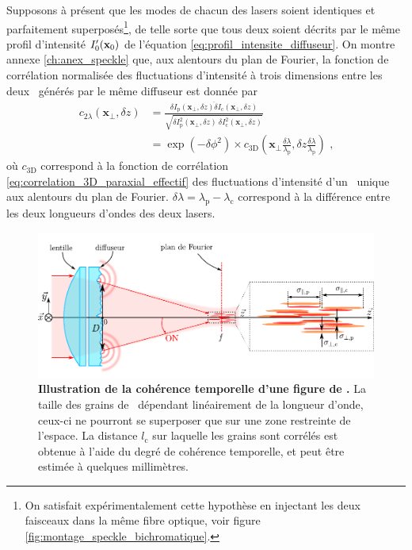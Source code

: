 Supposons à présent que les modes de chacun des lasers soient identiques et parfaitement superposés\footnote{On satisfait expérimentalement cette hypothèse en injectant les deux faisceaux dans la même fibre optique, voir figure \ref{fig:montage_speckle_bichromatique}.}, de telle sorte que tous deux soient décrits par le même profil d'intensité $I'_0(\mathbf{x}_0)$ de l'équation \ref{eq:profil_intensite_diffuseur}. On montre annexe \ref{ch:anex_speckle} que, aux alentours du plan de Fourier, la fonction de corrélation normalisée des fluctuations d'intensité à trois dimensions entre les deux \speckles\ générés par le même diffuseur est donnée par
\begin{align}
\nonumber c_{\mathrm{2}\lambda} (\mathbf{x}_{\perp},\delta z) &=\frac{\overline{\delta I_{\mathrm{p}}(\mathbf{x}_{\perp},\delta z) \delta I_{\mathrm{c}}(\mathbf{x}_{\perp},\delta z)}}{\sqrt{\overline{\delta I_{\mathrm{p}}^2(\mathbf{x}_{\perp},\delta z)} \: \overline{\delta I_{\mathrm{c}}^2(\mathbf{x}_{\perp},\delta z)}}}\\
&=\exp{\left( -\delta\phi^2 \right)}\times c_{\mathrm{3D}}\left( \mathbf{x}_{\perp} \frac{\delta\lambda}{\lambda_{\mathrm{p}}}, \delta z\frac{\delta\lambda}{\lambda_{\mathrm{p}}} \right) \text{ ,}
\label{eq:correlation_2_lambda}
\end{align}
où $c_{\mathrm{3D}}$ correspond à la fonction de corrélation \ref{eq:correlation_3D_paraxial_effectif} des fluctuations d'intensité d'un \speckle\ unique aux alentours du plan de Fourier. $\delta\lambda=\lambda_{\mathrm{p}}-\lambda_{\mathrm{c}}$ correspond à la différence entre les deux longueurs d'ondes des deux lasers.

\begin{figure}
\centering
\includegraphics[width=\textwidth]{Fig/Speckle/illustration_correlation_double_speckle.pdf}
\caption{\textbf{Illustration de la cohérence temporelle d'une figure de \speckle .} La taille des grains de \speckle\ dépendant linéairement de la longueur d'onde, ceux-ci ne pourront se superposer que sur une zone restreinte de l'espace. La distance $l_{\mathrm{c}}$ sur laquelle les grains sont corrélés est obtenue à l'aide du degré de cohérence temporelle, et peut être estimée à quelques millimètres.}
\label{fig:illustration_correlation_double_speckle}
\end{figure}

